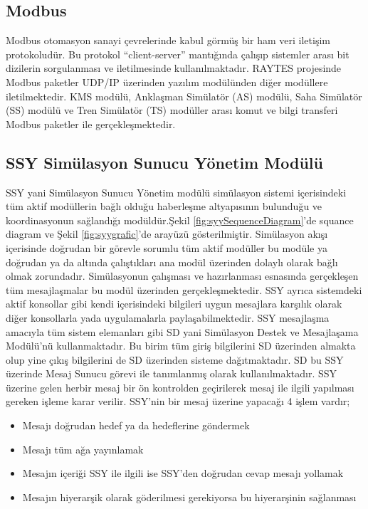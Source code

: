 \documentclass[conference]{IEEEtran}
\begin{document}
\subsection{Modbus}
Modbus otomasyon sanayi çevrelerinde kabul görmüş bir ham veri iletişim protokoludür. Bu protokol “client-server” mantığında çalışıp sistemler arası bit dizilerin sorgulanması ve iletilmesinde kullanılmaktadır. RAYTES projesinde Modbus paketler UDP/IP üzerinden yazılım modülünden diğer modüllere iletilmektedir. KMS modülü, Anklaşman Simülatör (AS) modülü, Saha Simülatör (SS) modülü ve Tren Simülatör (TS) modüller arası komut ve bilgi transferi Modbus paketler ile gerçekleşmektedir.


\subsection{SSY Simülasyon Sunucu Yönetim Modülü}
SSY yani Simülasyon Sunucu Yönetim modülü simülasyon sistemi içerisindeki tüm aktif modüllerin bağlı olduğu haberleşme altyapısının bulunduğu ve koordinasyonun sağlandığı modüldür.Şekil \ref{fig:syySequenceDiagram}'de squance diagram ve  Şekil \ref{fig:syygrafic}'de arayüzü gösterilmiştir.
Simülasyon akışı içerisinde doğrudan bir görevle sorumlu tüm aktif modüller bu modüle ya doğrudan ya da altında çalıştıkları ana modül üzerinden dolaylı olarak bağlı olmak zorundadır. Simülasyonun çalışması ve hazırlanması esnasında gerçekleşen tüm mesajlaşmalar bu modül üzerinden gerçekleşmektedir.
SSY ayrıca sistemdeki aktif konsollar gibi kendi içerisindeki bilgileri uygun mesajlara karşılık olarak diğer konsollarla yada uygulamalarla paylaşabilmektedir.
SSY mesajlaşma amacıyla tüm sistem elemanları gibi SD yani Simülasyon Destek ve Mesajlaşama Modülü’nü kullanmaktadır. Bu birim tüm giriş bilgilerini SD üzerinden almakta olup yine çıkış bilgilerini de SD üzerinden sisteme dağıtmaktadır. SD bu SSY üzerinde Mesaj Sunucu görevi ile tanımlanmış olarak kullanılmaktadır.
SSY üzerine gelen herbir mesaj bir ön kontrolden geçirilerek mesaj ile ilgili yapılması gereken işleme karar verilir. SSY’nin bir mesaj üzerine yapacağı 4 işlem vardır;

\begin{itemize}
\item Mesajı doğrudan hedef ya da hedeflerine göndermek
\item Mesajı tüm ağa yayınlamak
\item Mesajın içeriği SSY ile ilgili ise SSY’den doğrudan cevap mesajı yollamak
\item Mesajın hiyerarşik olarak göderilmesi gerekiyorsa bu hiyerarşinin sağlanması
\end{itemize}
\end{document}
